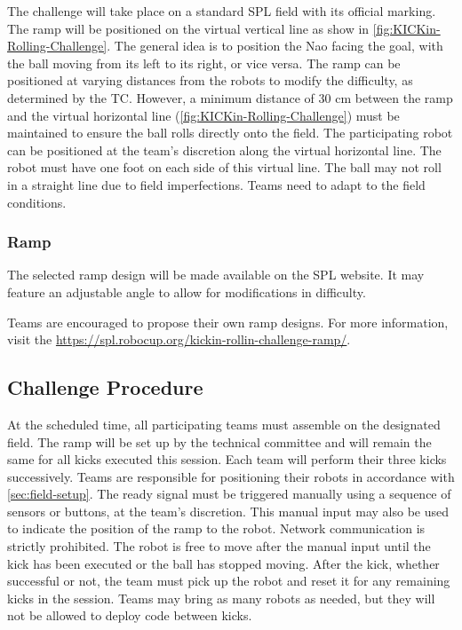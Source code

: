The challenge will take place on a standard SPL field with its official marking. 
The ramp will be positioned on the virtual vertical line as show in \cref{fig:KICKin-Rolling-Challenge}.
The general idea is to position the Nao facing the goal, with the ball moving from its left to its right, or vice versa.
The ramp can be positioned at varying distances from the robots to modify the difficulty, as determined by the TC.
However, a minimum distance of 30 cm between the ramp and the virtual horizontal line (\cref{fig:KICKin-Rolling-Challenge}) must be maintained to ensure the ball rolls directly onto the field.
The participating robot can be positioned at the team’s discretion along the virtual horizontal line.
The robot must have one foot on each side of this virtual line.
The ball may not roll in a straight line due to field imperfections.
Teams need to adapt to the field conditions. 

\subsubsection{Ramp}

The selected ramp design will be made available on the SPL website. 
It may feature an adjustable angle to allow for modifications in difficulty.  

Teams are encouraged to propose their own ramp designs. 
For more information, visit the \url{https://spl.robocup.org/kickin-rollin-challenge-ramp/}.

\subsection{Challenge Procedure}

At the scheduled time, all participating teams must assemble on the designated field.
The ramp will be set up by the technical committee and will remain the same for all kicks executed this session.
Each team will perform their three kicks successively.
Teams are responsible for positioning their robots in accordance with \cref{sec:field-setup}.
The ready signal must be triggered manually using a sequence of sensors or buttons, at the team’s discretion.
This manual input may also be used to indicate the position of the ramp to the robot.
Network communication is strictly prohibited.
The robot is free to move after the manual input until the kick has been executed or the ball has stopped moving.
After the kick, whether successful or not, the team must pick up the robot and reset it for any remaining kicks in the session.
Teams may bring as many robots as needed, but they will not be allowed to deploy code between kicks.

